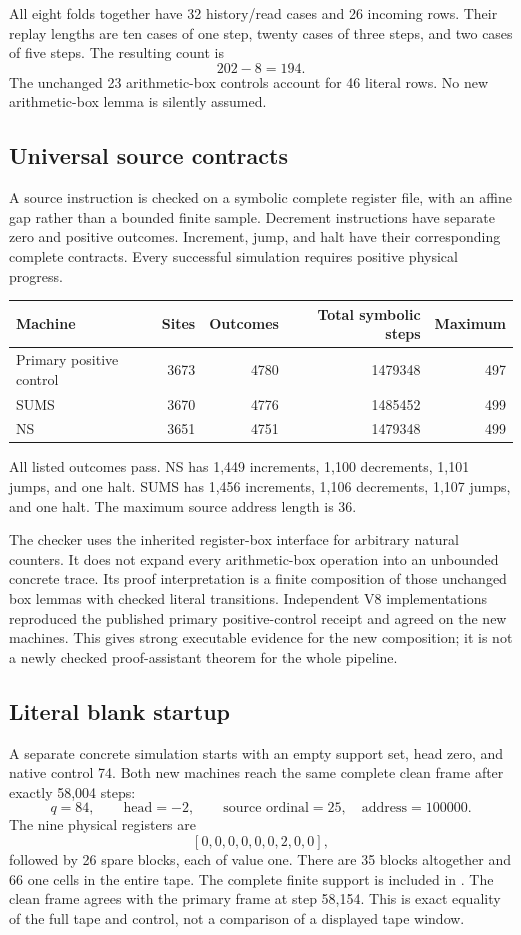 \documentclass[11pt,a4paper]{article}
\newcommand{\file}[1]{\path{#1}}
\begin{document}
All eight folds together have 32 history/read cases and 26 incoming rows.
Their replay lengths are ten cases of one step, twenty cases of three
steps, and two cases of five steps. The resulting count is
\[
       202-8=194.
\]
The unchanged 23 arithmetic-box controls account for 46 literal rows.
No new arithmetic-box lemma is silently assumed.

\subsection{Universal source contracts}
A source instruction is checked on a symbolic complete register file,
with an affine gap rather than a bounded finite sample. Decrement
instructions have separate zero and positive outcomes. Increment,
jump, and halt have their corresponding complete contracts. Every
successful simulation requires positive physical progress.
\begin{center}
\begin{tabular}{lrrrr}
\toprule
Machine & Sites & Outcomes & Total symbolic steps & Maximum\\
\midrule
Primary positive control &3673&4780&1479348&497\\
SUMS &3670&4776&1485452&499\\
NS &3651&4751&1479348&499\\
\bottomrule
\end{tabular}
\end{center}
All listed outcomes pass. NS has 1,449 increments, 1,100 decrements,
1,101 jumps, and one halt. SUMS has 1,456 increments, 1,106 decrements,
1,107 jumps, and one halt. The maximum source address length is 36.

The checker uses the inherited register-box interface for arbitrary
natural counters. It does not expand every arithmetic-box operation
into an unbounded concrete trace. Its proof interpretation is a finite
composition of those unchanged box lemmas with checked literal
transitions. Independent V8 implementations reproduced the published
primary positive-control receipt and agreed on the new machines.
This gives strong executable evidence for the new composition; it
is not a newly checked proof-assistant theorem for the whole pipeline.

\subsection{Literal blank startup}
A separate concrete simulation starts with an empty support set, head
zero, and native control 74. Both new machines reach the same complete
clean frame after exactly 58,004 steps:
\[
 q=84,\qquad \text{head}=-2,\qquad
 \text{source ordinal}=25,\quad\text{address}=100000.
\]
The nine physical registers are
\[
 [0,0,0,0,0,0,2,0,0],
\]
followed by 26 spare blocks, each of value one. There are 35 blocks
altogether and 66 one cells in the entire tape. The complete finite
support is included in \file{evidence/startup_support.json}.
The clean frame agrees with the primary frame at step 58,154.
This is exact equality of the full tape and control, not a comparison
of a displayed tape window.
\end{document}
